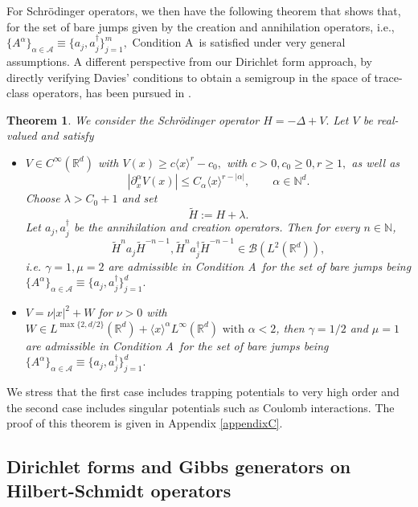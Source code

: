 \documentclass[11pt]{amsart}
\newcommand{\1}{\mathbbm{1}}
\renewcommand{\theconditionA}{A}
\newcommand{\cA}{\mathcal{A}}
\theoremstyle{plain}
\newtheorem{theorem}{Theorem}[section]
\theoremstyle{definition}
\theoremstyle{remark}
\numberwithin{equation}{section}
\begin{document}
For Schr\"odinger operators, we then have the following theorem that shows that, for the set of bare jumps given by the creation and annihilation operators, i.e., $\{A^\alpha\}_{\alpha\in\cA}\equiv \{a_j,a^\dagger_j\}_{j=1}^m,$ Condition \theconditionA \ is satisfied under very general assumptions. 
A different perspective from our Dirichlet form approach, by directly verifying Davies' conditions to obtain a semigroup in the space of trace-class operators, has been pursued in \cite{GalkowskiZworskiDavies}.    
\begin{theorem}
\label{thm:Schroedinger_operators}
    We consider the Schr\"odinger operator $H=-\Delta+V.$ 
    Let $V$ be real-valued and satisfy 
\begin{itemize}
\item $V \in C^{\infty}(\mathbb R^d)$ with $
V(x)\ge c\langle x\rangle^r-c_0,$ with $ c>0,c_0 \ge 0, r\ge 1,$
as well as
\[
|\partial_x^\alpha V(x)|\le C_\alpha \langle x\rangle^{r-|\alpha|},
\qquad \alpha\in\mathbb N^d.
\]
Choose $\lambda>C_0+1$ and set 
\[
\widetilde H:=H+\lambda.
\]
Let $a_j,a_j^{\dagger}$ be the annihilation and creation operators.
Then for every $n\in\mathbb N$,
\[
\widetilde H^n a_j \widetilde H^{-n-1},\widetilde H^n a_j^{\dagger} \widetilde H^{-n-1}\in \mathcal B(L^2(\mathbb R^d)),
\]
i.e. $\gamma=1,\mu=2$ are admissible in Condition \theconditionA \  for the set of bare jumps being $\{A^\alpha\}_{\alpha\in\cA}\equiv \{a_j,a^\dagger_j\}_{j=1}^d.$
\item $V=\nu |x|^2 + W$ for $\nu>0$ with $W \in  L^{\max\{2,d/2\}}(\mathbb R^d)+ \langle x \rangle^{\alpha} L^{\infty}(\mathbb R^d)\text{ with } \alpha<2$, then $\gamma=1/2$ and $\mu=1$ are admissible in Condition \theconditionA \ for the set of bare jumps being $\{A^\alpha\}_{\alpha\in\cA}\equiv \{a_j,a^\dagger_j\}_{j=1}^d.$
\end{itemize}
\end{theorem}
We stress that the first case includes trapping potentials to very high order and the second case includes singular potentials such as Coulomb interactions. 
The proof of this theorem is given in Appendix \ref{appendixC}.














\subsection{Dirichlet forms and Gibbs generators on Hilbert-Schmidt operators}
\end{document}
